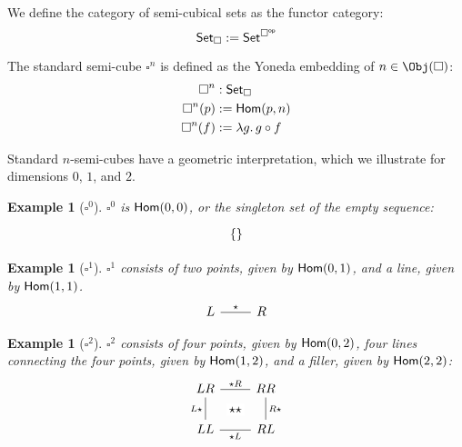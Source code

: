\documentclass{msc}
\newcommand{\Cube}{\ensuremath{\boldsymbol{{\square}}}}
\newcommand{\CSet}{\ensuremath{\mathsf{Set}_{\boldsymbol{\square}}}}
\newtheorem{example}[therm]{Example}
\newcommand{\kstar}{{\star}}
\begin{document}
\begin{definition}[\CSet]
  We define the category of semi-cubical sets as the functor category:
  \begin{equation*}
    \CSet := \Set^{\op{\Cube}}
  \end{equation*}
\end{definition}

\begin{definition}[$\Cube^n$]
  The standard semi-cube $\Cube^n$ is defined as the Yoneda embedding of $n \in \Obj(\Cube)$:
  \begin{align*}
    \Cube^n    & : \CSet                    \\
    \Cube^n(p) & := \Hom(p, n)              \\
    \Cube^n(f) & := \lambda g .\, g \circ f
  \end{align*}
\end{definition}

Standard $n$-semi-cubes have a geometric interpretation, which we illustrate for dimensions $0$, $1$, and $2$.

\begin{example}[$\Cube^0$]
  $\Cube^0$ is $\mathsf{Hom}(0, 0)$, or the singleton set of the empty sequence:
  \begin{equation*}
    \begin{tikzcd}
      \{\}
    \end{tikzcd}
  \end{equation*}
\end{example}

\begin{example}[$\Cube^1$]
  $\Cube^1$ consists of two points, given by $\mathsf{Hom}(0, 1)$, and a line, given by $\mathsf{Hom}(1, 1)$.
  \begin{equation*}
    \begin{tikzcd}
      L \arrow[r, "\kstar", dash] & R
    \end{tikzcd}
  \end{equation*}
\end{example}

\begin{example}[$\Cube^2$]
  $\Cube^2$ consists of four points, given by $\mathsf{Hom}(0, 2)$, four lines connecting the four points, given by $\mathsf{Hom}(1, 2)$, and a filler, given by $\mathsf{Hom}(2, 2)$:
  \begin{equation*}
    \begin{tikzcd}
      LR \arrow[r, dash, "\kstar R"{name=F}] \arrow[d, dash, "L\kstar" left] & RR \arrow[d, dash, "R\kstar"] \\
      LL \arrow[r, dash, "\kstar L"{name=T, below}] & RL \\
      \arrow[rightarrow, from=F, to=T, phantom, "\kstar\kstar" description]
    \end{tikzcd}
  \end{equation*}
\end{example}
\end{document}
